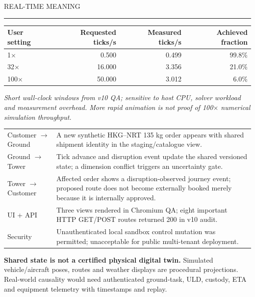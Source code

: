 \documentclass[10pt,a4paper]{article}
\newcommand{\sect}[2]{\vspace{4mm}{\Large\sffamily\bfseries #1}\hfill{\small\sffamily\color{muted}#2}\par\vspace{1mm}\color{sage}\rule{\linewidth}{1.0pt}\color{ink}\vspace{2mm}}
\newcommand{\subsect}[1]{\vspace{3mm}{\large\sffamily\bfseries #1}\par\vspace{1mm}}
\newcommand{\methodnote}[1]{{\footnotesize\color{muted}\textit{#1}}\par}
\begin{document}
\sect{10 / Digital Twin and runtime QA}{REAL-TIME MEANING}
\par\vspace{2mm}
\begin{tabularx}{\linewidth}{@{}lrrr@{}}
\toprule
User setting & Requested ticks/s & Measured ticks/s & Achieved fraction\\\midrule
1$\times$ & 0.500 & 0.499 & 99.8\%\\
32$\times$ & 16.000 & 3.356 & 21.0\%\\
100$\times$ & 50.000 & 3.012 & 6.0\%\\
\bottomrule
\end{tabularx}
\methodnote{Short wall-clock windows from v10 QA; sensitive to host CPU, solver workload and measurement overhead. More rapid animation is not proof of 100$\times$ numerical simulation throughput.}
\subsect{Cross-Twin integration checks}
\begin{tabularx}{\linewidth}{@{}p{40mm}X@{}}
\toprule
Customer $\rightarrow$ Ground & A new synthetic HKG--NRT 135 kg order appears with shared shipment identity in the staging/catalogue view.\\
Ground $\rightarrow$ Tower & Tick advance and disruption event update the shared versioned state; a dimension conflict triggers an uncertainty gate.\\
Tower $\rightarrow$ Customer & Affected order shows a disruption-observed journey event; proposed route does not become externally booked merely because it is internally approved.\\
UI + API & Three views rendered in Chromium QA; eight important HTTP GET/POST routes returned 200 in v10 audit.\\
Security & Unauthenticated local sandbox control mutation was permitted; unacceptable for public multi-tenant deployment.\\
\bottomrule
\end{tabularx}
\begin{caution}
\textbf{Shared state is not a certified physical digital twin.} Simulated vehicle/aircraft poses, routes and weather displays are procedural projections. Real-world causality would need authenticated ground-task, ULD, custody, ETA and equipment telemetry with timestamps and replay.
\end{caution}
\newpage
\end{document}
